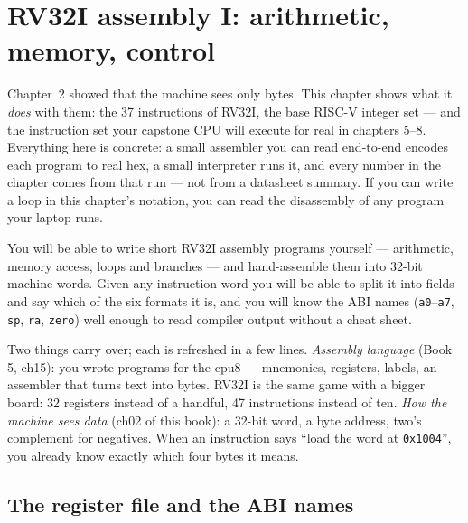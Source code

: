 \chapter{RV32I assembly I: arithmetic, memory, control}
\label{ch:03}

Chapter~2 showed that the machine sees only bytes. This chapter shows
what it \emph{does} with them: the 37 instructions of RV32I, the base
RISC-V integer set --- and the instruction set your capstone CPU will
execute for real in chapters 5--8. Everything here is concrete: a small
assembler you can read end-to-end encodes each program to real hex, a
small interpreter runs it, and every number in the chapter comes from
that run --- not from a datasheet summary. If you can write a loop in
this chapter's notation, you can read the disassembly of any program
your laptop runs.

\begin{wins}
You will be able to write short RV32I assembly programs yourself ---
arithmetic, memory access, loops and branches --- and hand-assemble
them into 32-bit machine words. Given any instruction word you will be
able to split it into fields and say which of the six formats it is,
and you will know the ABI names (\texttt{a0}--\texttt{a7}, \texttt{sp},
\texttt{ra}, \texttt{zero}) well enough to read compiler output without
a cheat sheet.
\end{wins}

\begin{rulebox}
Two things carry over; each is refreshed in a few lines.
\emph{Assembly language} (Book 5, ch15): you wrote programs for the
cpu8 --- mnemonics, registers, labels, an assembler that turns text
into bytes. RV32I is the same game with a bigger board: 32 registers
instead of a handful, 47 instructions instead of ten.
\emph{How the machine sees data} (ch02 of this book): a 32-bit word,
a byte address, two's complement for negatives. When an instruction
says ``load the word at \texttt{0x1004}'', you already know exactly
which four bytes it means.
\end{rulebox}

%
%
%

\section{The register file and the ABI names}
\label{sec:regs03}

